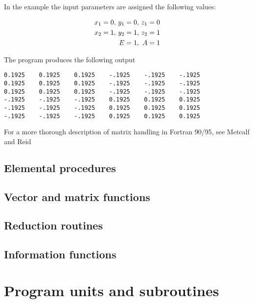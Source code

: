 In the example the input parameters are assigned the following values:

\begin{eqnarray}
x_{1} =0,\,y_{1} =0,\,z_{1} =0 \\
x_{2} =1,\,y_{2} =1,\,z_{2} =1 \\
E\/=\/1,\,\,A=1
\end{eqnarray}



The program produces the following output

\cmdmode

\begin{lstlisting}[numbers=none,breaklines=false]
0.1925    0.1925    0.1925    -.1925    -.1925    -.1925
0.1925    0.1925    0.1925    -.1925    -.1925    -.1925
0.1925    0.1925    0.1925    -.1925    -.1925    -.1925
-.1925    -.1925    -.1925    0.1925    0.1925    0.1925
-.1925    -.1925    -.1925    0.1925    0.1925    0.1925
-.1925    -.1925    -.1925    0.1925    0.1925    0.1925
\end{lstlisting}

\fmode

For a more thorough description of matrix handling in Fortran 90/95, see Metcalf and Reid \cite{metcalf00}

\subsection{Elemental procedures}
\subsection{Vector and matrix functions}
\subsection{Reduction routines}
\subsection{Information functions}

\section{Program units and subroutines}

